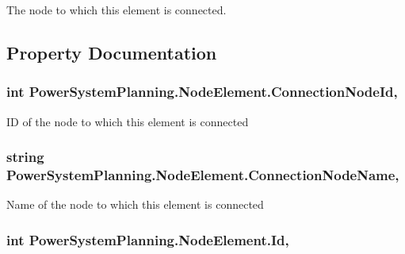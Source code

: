 The node to which this element is connected. 



\subsection{Property Documentation}
\subsubsection[{\texorpdfstring{Connection\+Node\+Id}{ConnectionNodeId}}]{\setlength{\rightskip}{0pt plus 5cm}int Power\+System\+Planning.\+Node\+Element.\+Connection\+Node\+Id\hspace{0.3cm}{\ttfamily [get]}, {\ttfamily [set]}}\hypertarget{class_power_system_planning_1_1_node_element_ad8330c198a514aa94bc329e89125796a}{}\label{class_power_system_planning_1_1_node_element_ad8330c198a514aa94bc329e89125796a}


ID of the node to which this element is connected 

\subsubsection[{\texorpdfstring{Connection\+Node\+Name}{ConnectionNodeName}}]{\setlength{\rightskip}{0pt plus 5cm}string Power\+System\+Planning.\+Node\+Element.\+Connection\+Node\+Name\hspace{0.3cm}{\ttfamily [get]}, {\ttfamily [set]}}\hypertarget{class_power_system_planning_1_1_node_element_a0649bf960bef5b6e95ab990de84caa66}{}\label{class_power_system_planning_1_1_node_element_a0649bf960bef5b6e95ab990de84caa66}


Name of the node to which this element is connected 

\subsubsection[{\texorpdfstring{Id}{Id}}]{\setlength{\rightskip}{0pt plus 5cm}int Power\+System\+Planning.\+Node\+Element.\+Id\hspace{0.3cm}{\ttfamily [get]}, {\ttfamily [set]}}\hypertarget{class_power_system_planning_1_1_node_element_aa18ee6e98501ec6c8c235058888a47e3}{}\label{class_power_system_planning_1_1_node_element_aa18ee6e98501ec6c8c235058888a47e3}


